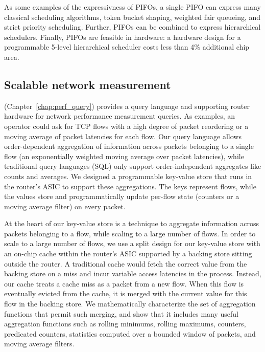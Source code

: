 
As some examples of the expressivness of PIFOs, a single PIFO can express many
classical scheduling algorithms, \eg token bucket shaping, weighted fair
queueing, and strict priority scheduling. Further, PIFOs can be combined to
express hierarchical schedulers. Finally, PIFOs are feasible in hardware: a
hardware design for a programmable 5-level hierarchical scheduler costs less
than 4\% additional chip area.

\subsection{Scalable network measurement}


\TheSystem (Chapter~\ref{chap:perf_query}) provides a query language and
supporting router hardware for network performance measurement queries. As
examples, an operator could ask for TCP flows with a high degree of packet
reordering or a moving average of packet latencies for each flow. Our query
language allows order-dependent aggregation of information across packets
belonging to a single flow (\eg an exponentially weighted moving average over
packet latencies), while traditional query languages (\eg SQL) only support
order-independent aggregates like counts and averages. We designed a
programmable key-value store that runs in the router's ASIC to support these
aggregations.  The keys represent flows, while the values store and
programmatically update per-flow state (\eg counters or a moving average
filter) on every packet.

At the heart of our key-value store is a technique to aggregate information
across packets belonging to a flow, while scaling to a large number of flows.
In order to scale to a large number of flows, we use a split design for our
key-value store with an on-chip cache within the router's ASIC supported by a
backing store sitting outside the router. A traditional cache would fetch the
correct value from the backing store on a miss and incur variable access
latencies in the process. Instead, our cache treats a cache miss as a packet
from a new flow. When this flow is eventually evicted from the cache, it is
merged with the current value for this flow in the backing store.  We
mathematically characterize the set of aggregation functions that permit such
merging, and show that it includes many useful aggregation functions such as
rolling minimums, rolling maximums, counters, predicated counters, statistics
computed over a bounded window of packets, and moving average filters.

